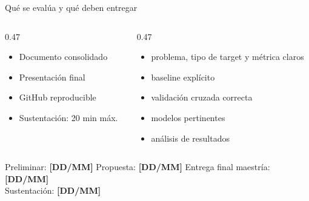 \documentclass[aspectratio=169,12pt]{beamer}
\newcommand{\pend}[1]{\textcolor{mlred}{\textbf{[#1]}}}
\begin{document}
\begin{frame}{Qué se evalúa y qué deben entregar}
  \begin{columns}[T]
    \begin{column}{0.47\textwidth}
      \begin{taskbox}
        \begin{itemize}
          \item Documento consolidado
          \item Presentación final
          \item GitHub reproducible
          \item Sustentación: 20 min máx.
        \end{itemize}
      \end{taskbox}
    \end{column}
    \begin{column}{0.47\textwidth}
      \begin{toolbox}
        \begin{itemize}
          \item problema, tipo de target y métrica claros
          \item baseline explícito
          \item validación cruzada correcta
          \item modelos pertinentes
          \item análisis de resultados
        \end{itemize}
      \end{toolbox}
    \end{column}
  \end{columns}
  \begin{rulebox}[Hitos]
    Preliminar: \pend{DD/MM} \quad Propuesta: \pend{DD/MM} \quad Entrega final maestría: \pend{DD/MM}\\
    Sustentación: \pend{DD/MM}
  \end{rulebox}
\end{frame}
\end{document}
